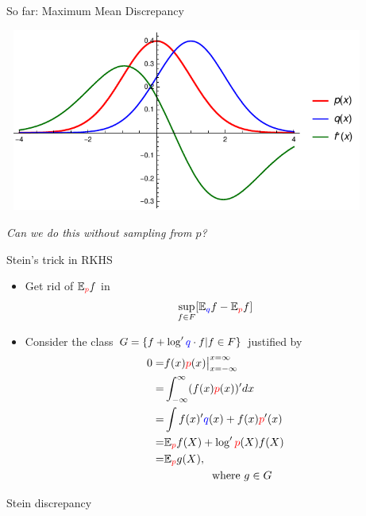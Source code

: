 \begin{frame}
\begin{columns}
\begin{column}{.33\linewidth}
\begin{block}{So far: Maximum Mean Discrepancy}
\begin{minipage}{.35\linewidth}
\begin{center}
\includegraphics[width=12cm,height=6cm]{./img/mmd.pdf}
\end{center}
\end{minipage}
\vspace{1cm}
\begin{center}
\emph{Can we do this without sampling from $p$?}
\end{center}
\end{block}
\vspace{-0.75cm}
\begin{block}{Stein's trick in RKHS}
\begin{itemize}
\item Get rid of $\mathbb{E}_{{\color{red} p}}f$  in
\begin{align*}
\sup_{f \in F} [\mathbb{E}_{{ \color{blue} q}}f - \mathbb{E}_{{\color{red} p}} f ]
\end{align*}
 \item Consider the  class $G = \{ f  +  \log' { \color{blue} q} \cdot  f | f \in F \}$ justified by 
\begin{align*}
 0= &  f(x) {\color{red} p}(x)  \big|_{x=-\infty}^{x=\infty} \\
   = &  \int_{-\infty}^{\infty} (f(x) {\color{red} p}(x) )'  dx \\
   = &  \int   f(x)' { \color{blue} q}(x)   + f(x){\color{red} p}'(x)  \\
   = &  \mathbb{E}_{\color{red} p} f(X)  +  \log' {\color{red} p}(X) f(X) \\
   = & \mathbb{E}_{\color{red} p} g(X), \\
    & \quad \quad \quad  \quad  \text{ where } g \in G
\end{align*}
\end{itemize}
\end{block}
\vspace{-0.75cm}
\begin{block}{Stein discrepancy}

\end{block}
\end{column}
\end{columns}
\end{frame}
